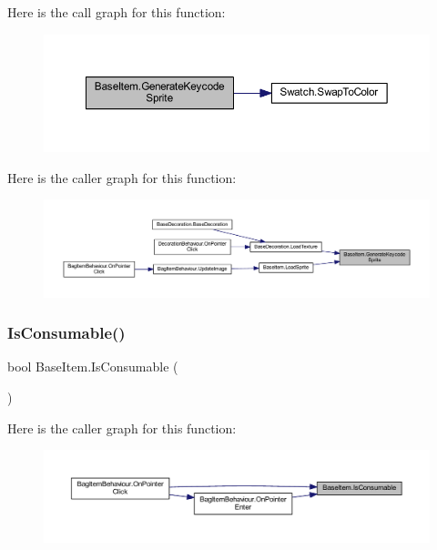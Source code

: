 Here is the call graph for this function\+:\nopagebreak
\begin{figure}[H]
\begin{center}
\leavevmode
\includegraphics[width=350pt]{class_base_item_a0bb5888f3371b291645137272f417b30_cgraph}
\end{center}
\end{figure}
Here is the caller graph for this function\+:\nopagebreak
\begin{figure}[H]
\begin{center}
\leavevmode
\includegraphics[width=350pt]{class_base_item_a0bb5888f3371b291645137272f417b30_icgraph}
\end{center}
\end{figure}
\mbox{\label{class_base_item_a3888fc05b9a0589c098ed9a8c2f978f2}} 
\subsubsection{\texorpdfstring{IsConsumable()}{IsConsumable()}}
{\footnotesize\ttfamily bool Base\+Item.\+Is\+Consumable (\begin{DoxyParamCaption}{ }\end{DoxyParamCaption})}

Here is the caller graph for this function\+:\nopagebreak
\begin{figure}[H]
\begin{center}
\leavevmode
\includegraphics[width=350pt]{class_base_item_a3888fc05b9a0589c098ed9a8c2f978f2_icgraph}
\end{center}
\end{figure}
\mbox{\label{class_base_item_a251c4cb0509ed9191a07057f8ea388c6}} 

